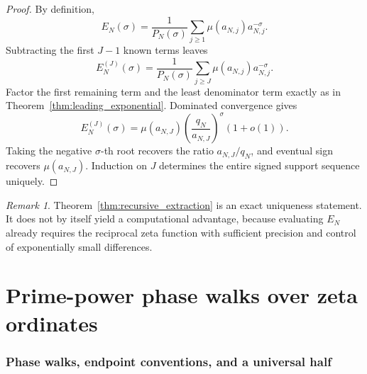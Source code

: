 \documentclass[11pt]{amsart}
\numberwithin{equation}{section}
\theoremstyle{plain}
\theoremstyle{definition}
\theoremstyle{remark}
\newtheorem{remark}[theorem]{Remark}
\newcommand{\1}{\mathbf{1}}
\begin{document}
\begin{proof}
By definition,
\begin{equation}
E_N(\sigma)
=
\frac{1}{P_N(\sigma)}
\sum_{j\geq1}\mu(a_{N,j})a_{N,j}^{-\sigma}.
\label{eq:recursive_full_expansion}
\end{equation}
Subtracting the first \(J-1\) known terms leaves
\begin{equation}
E_N^{(J)}(\sigma)
=
\frac{1}{P_N(\sigma)}
\sum_{j\geq J}\mu(a_{N,j})a_{N,j}^{-\sigma}.
\label{eq:recursive_residual_exact}
\end{equation}
Factor the first remaining term and the least denominator term exactly as
in Theorem~\ref{thm:leading_exponential}.  Dominated convergence gives
\begin{equation}
E_N^{(J)}(\sigma)
=
\mu(a_{N,J})
\left(\frac{q_N}{a_{N,J}}\right)^\sigma
(1+o(1)).
\label{eq:recursive_leading_asymptotic}
\end{equation}
Taking the negative \(\sigma\)-th root recovers the ratio
\(a_{N,J}/q_N\), and eventual sign recovers \(\mu(a_{N,J})\).  Induction
on \(J\) determines the entire signed support sequence uniquely.
\end{proof}

\begin{remark}
\label{rem:recursive_not_algorithmic_gain}
Theorem~\ref{thm:recursive_extraction} is an exact uniqueness statement.
It does not by itself yield a computational advantage, because evaluating
$E_N$ already requires the reciprocal zeta function with sufficient
precision and control of exponentially small differences.
\end{remark}


\part{Prime-power phase walks over zeta ordinates}

\section{Phase walks, endpoint conventions, and a universal half}
\label{sec:phase_walks}
\end{document}
